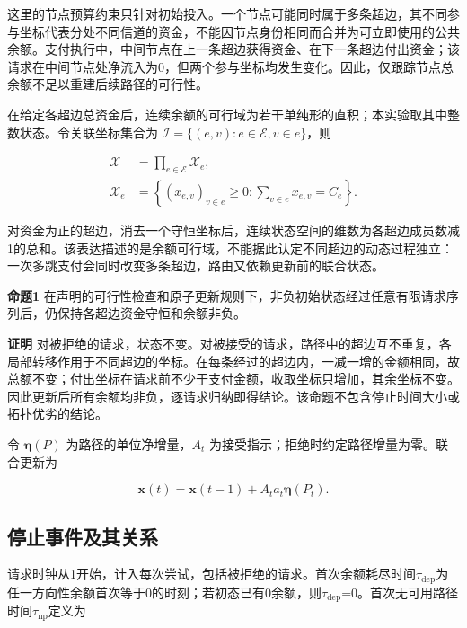 \documentclass[UTF8,a4paper,twocolumn,fontset=none,zihao=5]{ctexart}
\begin{document}
这里的节点预算约束只针对初始投入。一个节点可能同时属于多条超边，其不同参与坐标代表分处不同信道的资金，不能因节点身份相同而合并为可立即使用的公共余额。支付执行中，中间节点在上一条超边获得资金、在下一条超边付出资金；该请求在中间节点处净流入为0，但两个参与坐标均发生变化。因此，仅跟踪节点总余额不足以重建后续路径的可行性。


在给定各超边总资金后，连续余额的可行域为若干单纯形的直积；本实验取其中整数状态。令关联坐标集合为 $\mathcal I=\{(e,v):e\in\mathcal E,v\in e\}$，则



\begin{equation}
\begin{aligned}\mathcal X&=\prod_{e\in\mathcal E}\mathcal X_e,\\\mathcal X_e&=\left\{(x_{e,v})_{v\in e}\geq0:\sum_{v\in e}x_{e,v}=C_e\right\}.\end{aligned}
\label{eq:3}\end{equation}


对资金为正的超边，消去一个守恒坐标后，连续状态空间的维数为各超边成员数减1的总和。该表达描述的是余额可行域，不能据此认定不同超边的动态过程独立：一次多跳支付会同时改变多条超边，路由又依赖更新前的联合状态。


\noindent\textbf{命题1} 在声明的可行性检查和原子更新规则下，非负初始状态经过任意有限请求序列后，仍保持各超边资金守恒和余额非负。\par

\noindent\textbf{证明} 对被拒绝的请求，状态不变。对被接受的请求，路径中的超边互不重复，各局部转移作用于不同超边的坐标。在每条经过的超边内，一减一增的金额相同，故总额不变；付出坐标在请求前不少于支付金额，收取坐标只增加，其余坐标不变。因此更新后所有余额均非负，逐请求归纳即得结论。该命题不包含停止时间大小或拓扑优劣的结论。\par

令 $\boldsymbol\eta(P)$ 为路径的单位净增量，$A_t$ 为接受指示；拒绝时约定路径增量为零。联合更新为



\begin{equation}
\boldsymbol x(t)=\boldsymbol x(t-1)+A_ta_t\boldsymbol\eta(P_t).
\label{eq:4}\end{equation}


\subsection{停止事件及其关系}

请求时钟从1开始，计入每次尝试，包括被拒绝的请求。首次余额耗尽时间$\tau_{\mathrm{dep}}$为任一方向性余额首次等于0的时刻；若初态已有0余额，则$\tau_{\mathrm{dep}}$=0。首次无可用路径时间$\tau_{\mathrm{np}}$定义为
\end{document}
